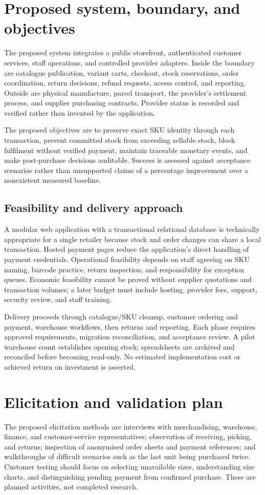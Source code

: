 \section{Proposed system, boundary, and objectives}
The proposed system integrates a public storefront, authenticated customer services, staff operations, and controlled provider adapters. Inside the boundary are catalogue publication, variant carts, checkout, stock reservations, order coordination, return decisions, refund requests, access control, and reporting. Outside are physical manufacture, parcel transport, the provider's settlement process, and supplier purchasing contracts. Provider status is recorded and verified rather than invented by the application.

The proposed objectives are to preserve exact SKU identity through each transaction, prevent committed stock from exceeding sellable stock, block fulfilment without verified payment, maintain traceable monetary events, and make post-purchase decisions auditable. Success is assessed against acceptance scenarios rather than unsupported claims of a percentage improvement over a nonexistent measured baseline.

\subsection{Feasibility and delivery approach}
A modular web application with a transactional relational database is technically appropriate for a single retailer because stock and order changes can share a local transaction. Hosted payment pages reduce the application's direct handling of payment credentials. Operational feasibility depends on staff agreeing on SKU naming, barcode practice, return inspection, and responsibility for exception queues. Economic feasibility cannot be proved without supplier quotations and transaction volumes; a later budget must include hosting, provider fees, support, security review, and staff training.

Delivery proceeds through catalogue/SKU cleanup, customer ordering and payment, warehouse workflows, then returns and reporting. Each phase requires approved requirements, migration reconciliation, and acceptance review. A pilot warehouse count establishes opening stock; spreadsheets are archived and reconciled before becoming read-only. No estimated implementation cost or achieved return on investment is asserted.

\section{Elicitation and validation plan}
The proposed elicitation methods are interviews with merchandising, warehouse, finance, and customer-service representatives; observation of receiving, picking, and returns; inspection of anonymised order sheets and payment references; and walkthroughs of difficult scenarios such as the last unit being purchased twice. Customer testing should focus on selecting unavailable sizes, understanding size charts, and distinguishing pending payment from confirmed purchase. These are planned activities, not completed research.

